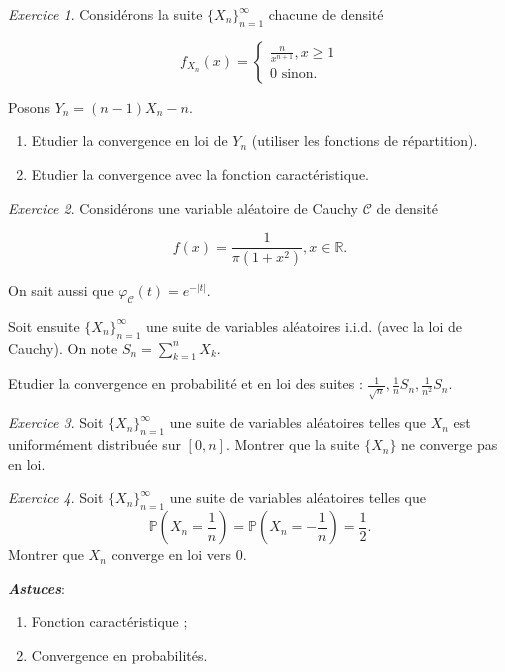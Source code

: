 \documentclass[french]{book}
\theoremstyle{definition}
\theoremstyle{remark}
\newtheorem{exo}{Exercice}
\begin{document}
\begin{exo}
  Considérons la suite \(\{ X_n \}_{n=1}^{\infty}\) chacune de densité

  \[f _{X_n}(x) = \begin{cases}
    \frac{n}{x ^{n+1}}, x \geq  1 \\
    0 \text{ sinon. }
  \end{cases}\]

  Posons \(Y_n = (n-1)X_n -n\).

  \begin{enumerate}
    \item Etudier la convergence en loi de \(Y_n\) (utiliser les fonctions de répartition).
    \item Etudier la convergence avec la fonction caractéristique.
  \end{enumerate}
\end{exo}

\begin{exo}
  Considérons une variable aléatoire de Cauchy \(\mathscr{C}\) de densité

  \[f(x) = \frac{1}{\pi(1+x ^2)}, x \in \mathbb{R}.\]

  On sait aussi que \(\varphi _{\mathscr{C}}(t) = e^{-\left\lvert t \right\rvert}\).

  Soit ensuite \(\{ X_n \}_{n=1}^{\infty}\) une suite de variables aléatoires i.i.d. (avec la loi de Cauchy). On note \(S_n = \displaystyle \sum_{k=1}^{n} X_k\).

  Etudier la convergence en probabilité et en loi des suites : \(\displaystyle \frac{1}{\sqrt{n}}, \displaystyle \frac{1}{n} S_n, \displaystyle \frac{1}{n ^2}S_n\).
\end{exo}

\begin{exo}
  Soit \(\{ X_n \}_{n=1}^{\infty}\) une suite de variables aléatoires telles que \(X_n\) est uniformément distribuée sur \([0,n]\). Montrer que la suite \(\{ X_n \}\) ne converge pas en loi.
\end{exo}

\begin{exo}
  Soit \(\{ X_n \}_{n=1}^{\infty}\) une suite de variables aléatoires telles que \[\mathbb{P}\left(X_n = \displaystyle\frac{1}{n}\right) = \mathbb{P}\left(X_n = - \displaystyle\frac{1}{n}\right) = \displaystyle\frac{1}{2}.\] Montrer que \(X_n\) converge en loi vers 0.

  \emph{\textbf{Astuces}}:
  \begin{enumerate}
    \item Fonction caractéristique ;
    \item Convergence en probabilités.
  \end{enumerate}
\end{exo}
\end{document}
